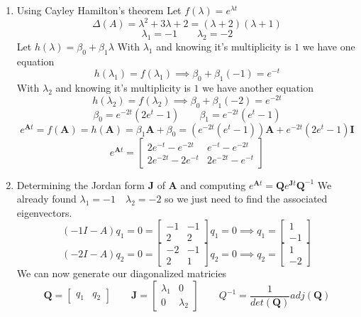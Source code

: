 \documentclass{article}
\begin{document}
\begin{enumerate}[1.]
\item Using Cayley Hamilton's theorem
\newline
Let $f(\lambda) = e^{\lambda t}$
$$\Delta(A) = \lambda^2 + 3\lambda + 2 = (\lambda+2)(\lambda+1)$$
$$ \lambda_1 = -1 \qquad \lambda_2 = -2 $$
Let $h(\lambda) = \beta_0 + \beta_1\lambda$
\newline
With $\lambda_1$ and knowing it's multiplicity is $1$ we have one equation
$$ h(\lambda_1) = f(\lambda_1) \implies \beta_0 + \beta_1(-1) = e^{-t}$$
With $\lambda_2$ and knowing it's multiplicity is $1$ we have another equation
$$ h(\lambda_2) = f(\lambda_2) \implies \beta_0 + \beta_1(-2) = e^{-2t}$$
$$ \beta_0 = e^{-2t}(2e^{t}-1)  \qquad \beta_1 = e^{-2t}(e^t-1) $$
$$
e^{\mathbf{A}t} = f(\mathbf{A}) = h(\mathbf{A}) =
\beta_1\mathbf{A} + \beta_0
=
(e^{-2t}(e^t-1))\mathbf{A} + e^{-2t}(2e^{t}-1)\mathbf{I}
$$
$$
e^{\mathbf{A}t}
=
\begin{bmatrix}
2e^{-t}-e^{-2t}  & e^{-t}-e^{-2t} \\
2e^{-2t}-2e^{-t} & 2e^{-2t}-e^{-t}
\end{bmatrix}
$$
\item Determining the Jordan form $\mathbf{J}$ of $\mathbf{A}$ and computing $e^{\mathbf{A}t} = \mathbf{Q}e^{\mathbf{J}t}\mathbf{Q}^{-1}$
\newline
We already found $\lambda_1 = -1 \quad \lambda_2 = -2$ so we just need to find the associated eigenvectors.
$$
(-1I -A)q_1=0
=
\begin{bmatrix}
-1 & -1 \\
2 & 2
\end{bmatrix}
q_1=0
\implies
q_1 = \begin{bmatrix} 1 \\ -1 \end{bmatrix}
$$
$$
(-2I -A)q_2=0
=
\begin{bmatrix}
-2 & -1 \\
2 & 1
\end{bmatrix}
q_2=0
\implies
q_2 = \begin{bmatrix} 1 \\ -2 \end{bmatrix}
$$
We can now generate our diagonalized matricies
$$
\mathbf{Q}=\begin{bmatrix} q_1 & q_2 \end{bmatrix}
\qquad
\mathbf{J}
=
\begin{bmatrix}
\lambda_1 & 0 \\
0 & \lambda_2
\end{bmatrix}
\qquad
Q^{-1}
=\frac{1}{det(\mathbf{Q})} adj(\mathbf{Q})
$$
\end{enumerate}
\end{document}
